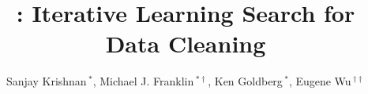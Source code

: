 \documentclass{sig-alternate}
\begin{document}
\newcommand{\reminder}[1]{{{\textcolor{magenta}{\{\{\bf #1\}\}}}\xspace}}
\newcommand{\ewu}[1]{{{\textcolor{blue}{\{\{\bf ewu:\} #1\}}}\xspace}}
\newcommand{\mps}[1]{{{\textcolor{red}{\{\{\bf meelap:\} #1\}}}\xspace}}
\newcommand{\stitle}[1]{\smallskip\noindent\textbf{#1: }}



\newcommand{\white}[1]{{\textcolor{white}{#1}\xspace}}
\newcommand{\blue}[1]{{\textcolor{blue}{{\bf #1}}\xspace}}
\newcommand{\orange}[1]{{\textcolor{orange}{{\bf #1}}\xspace}}
\newcommand{\pop}[1]{{\textcolor{pop}{{\textit{\textbf{#1}}}}\xspace}}
\newcommand{\red}[1]{\textcolor{red}{#1}}
\newcommand{\green}[1]{\textcolor{green}{#1}}
\newcommand{\gray}[1]{\textcolor{light-gray}{#1}}




\newcommand{\specialcell}[2][c]{%
  \begin{tabular}[#1]{@{}c@{}}#2\end{tabular}}

\def\ojoin{\setbox0=\hbox{$\bowtie$}%
  \rule[-.02ex]{.25em}{.4pt}\llap{\rule[\ht0]{.25em}{.4pt}}}
\def\leftouterjoin{\mathbin{\ojoin\mkern-5.8mu\bowtie}}
\def\rightouterjoin{\mathbin{\bowtie\mkern-5.8mu\ojoin}}
\def\fullouterjoin{\mathbin{\ojoin\mkern-5.8mu\bowtie\mkern-5.8mu\ojoin}}


\pagestyle{plain}

%

\title{\sys: Iterative Learning Search for Data Cleaning}


\author{ Sanjay Krishnan$\,^{*}$, Michael J. Franklin$\,^{*\dag}$, Ken Goldberg$\,^{*}$, Eugene Wu{$\,^{\dag\dag}$}  \\
 \\
\\
\affaddr{}
}

\end{document}
